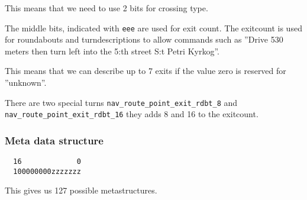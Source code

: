 \documentclass[a4paper]{article}
\begin{document}
This means that we need to use 2 bits for crossing type.

The middle bits, indicated with {\tt eee} are used for exit count.
The exitcount is used for roundabouts and turndescriptions to
allow commands such as ''Drive 530 meters then turn left
into the 5:th street S:t Petri Kyrkog''.

This means that we can describe up to 7 exits if the value zero
is reserved for ''unknown''.

There are two special turns {\tt  nav\_route\_point\_exit\_rdbt\_8} and
{\tt  nav\_route\_point\_exit\_rdbt\_16} they adds 8 and 16 to the exitcount.

\subsubsection{Meta data structure}

\begin{verbatim}
  16             0
  100000000zzzzzzz
\end{verbatim}

This gives us 127 possible metastructures.
\end{document}
